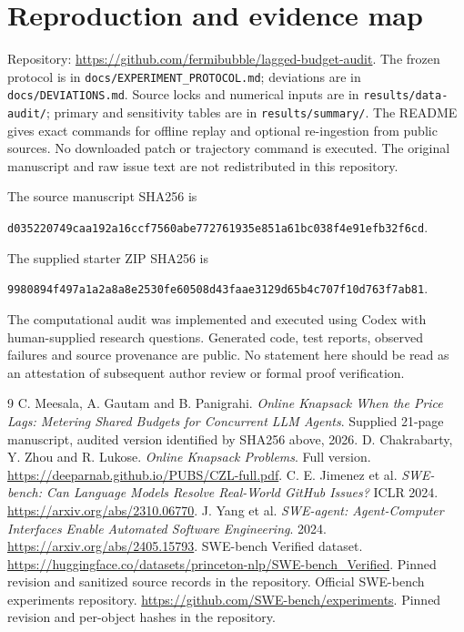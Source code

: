 \documentclass[11pt]{article}
\newcommand{\repo}{\url{https://github.com/fermibubble/lagged-budget-audit}}
\begin{document}
\appendix
\section{Reproduction and evidence map}
Repository: \repo. The frozen protocol is in \texttt{docs/EXPERIMENT\_PROTOCOL.md}; deviations are in \texttt{docs/DEVIATIONS.md}. Source locks and numerical inputs are in \texttt{results/data-audit/}; primary and sensitivity tables are in \texttt{results/summary/}. The README gives exact commands for offline replay and optional re-ingestion from public sources. No downloaded patch or trajectory command is executed. The original manuscript and raw issue text are not redistributed in this repository.

The source manuscript SHA256 is\par\noindent\texttt{\small d035220749caa192a16ccf7560abe772761935e851a61bc038f4e91efb32f6cd}.\par
The supplied starter ZIP SHA256 is\par\noindent\texttt{\small 9980894f497a1a2a8a8e2530fe60508d43faae3129d65b4c707f10d763f7ab81}.\par
The computational audit was implemented and executed using Codex with human-supplied research questions. Generated code, test reports, observed failures and source provenance are public. No statement here should be read as an attestation of subsequent author review or formal proof verification.

\begin{thebibliography}{9}
 C. Meesala, A. Gautam and B. Panigrahi. \emph{Online Knapsack When the Price Lags: Metering Shared Budgets for Concurrent LLM Agents}. Supplied 21-page manuscript, audited version identified by SHA256 above, 2026.
 D. Chakrabarty, Y. Zhou and R. Lukose. \emph{Online Knapsack Problems}. Full version. \url{https://deeparnab.github.io/PUBS/CZL-full.pdf}.
 C. E. Jimenez et al. \emph{SWE-bench: Can Language Models Resolve Real-World GitHub Issues?} ICLR 2024. \url{https://arxiv.org/abs/2310.06770}.
 J. Yang et al. \emph{SWE-agent: Agent-Computer Interfaces Enable Automated Software Engineering}. 2024. \url{https://arxiv.org/abs/2405.15793}.
 SWE-bench Verified dataset. \url{https://huggingface.co/datasets/princeton-nlp/SWE-bench_Verified}. Pinned revision and sanitized source records in the repository.
 Official SWE-bench experiments repository. \url{https://github.com/SWE-bench/experiments}. Pinned revision and per-object hashes in the repository.
\end{thebibliography}
\end{document}
